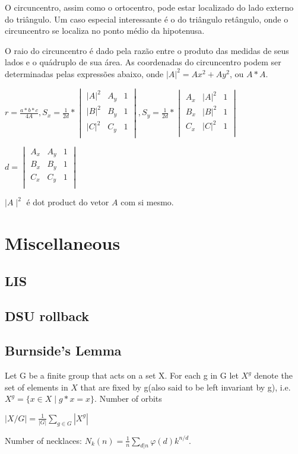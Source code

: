 \documentclass[a4paper,10pt,oneside]{article}
\newcommand\includes[2]{
   \subsection{#1}
   
}
\begin{document}
\begin{multicols}{2}
O circuncentro, assim como o ortocentro, pode estar localizado do lado externo do triângulo. Um caso especial interessante é o do triângulo retângulo, onde o circuncentro se localiza no ponto médio da hipotenusa.

O raio do circuncentro é dado pela razão entre o produto das medidas de seus lados e o quádruplo de sua área. As coordenadas do circuncentro podem ser determinadas pelas expressões abaixo, onde $|A|^2 = Ax^2 + Ay^2$, ou $A*A$.

$r = \frac{a*b*c}{4A}, S_x = \frac{1}{2d} * \begin{vmatrix}
|A|^2 & A_y & 1 \\
|B|^2 & B_y & 1 \\
|C|^2 & C_y & 1 \\
\end{vmatrix}, S_y = \frac{1}{2d} * \begin{vmatrix}
A_x & |A|^2 & 1 \\
B_x & |B|^2 & 1 \\
C_x & |C|^2 & 1 \\
\end{vmatrix}$

$d = \begin{vmatrix}
A_x & A_y & 1 \\
B_x & B_y & 1 \\
C_x & C_y & 1 \\
\end{vmatrix}$

$\mid A\mid^2$ é dot product do vetor $A$ com si mesmo.

\section{Miscellaneous}
\includes{LIS}{code/misc/lis.cpp}
\includes{DSU rollback}{code/misc/bipar.cpp}

\subsection{Burnside's Lemma}
Let G be a finite group that acts on a set X. For each g in G let $X^g$ denote the set of elements in $X$ that are fixed by g(also said to be left invariant by g), i.e. $X^g = \{x \in X \mid g*x = x \}$. Number of orbits

$\mid X / G \mid = \frac{1}{|G|} \sum_{g \in G}{|X^g|}$

Number of necklaces: $N_k(n) = \frac{1}{n} \sum_{d|n}{\varphi(d)k^{n/d}}$.

\end{multicols}
\end{document}
